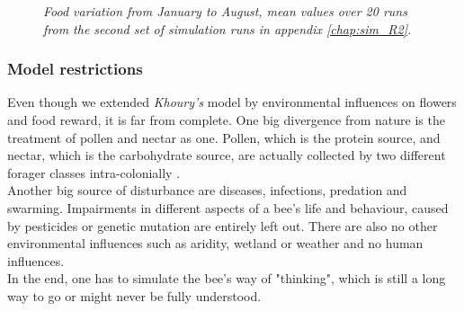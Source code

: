 		\begin{figure}[H]
			\centering
			\caption{\textit{Food variation from January to August, mean values over 20 runs from the second set of simulation runs in appendix \ref{chap:sim_R2}.}}
			\label{fig:foodVariation}
		\end{figure}
	
	\subsubsection{Model restrictions}
		\label{chap:modelRestrictions}
		Even though we extended \textit{Khoury's} model by environmental influences on flowers and food reward, it is far from complete. One big divergence from nature is the treatment of pollen and nectar as one. Pollen, which is the protein source, and nectar, which is the carbohydrate source, are actually collected by two different forager classes intra-colonially \cite{schmickl07}.\\  Another big source of disturbance are diseases, infections, predation and swarming. Impairments in different aspects of a bee's life and behaviour, caused by pesticides or genetic mutation are entirely left out. There are also no other environmental influences such as aridity, wetland or weather and no human influences. \\
		In the end, one has to simulate the bee's way of "thinking", which is still a long way to go or might never be fully understood. %
		
	
